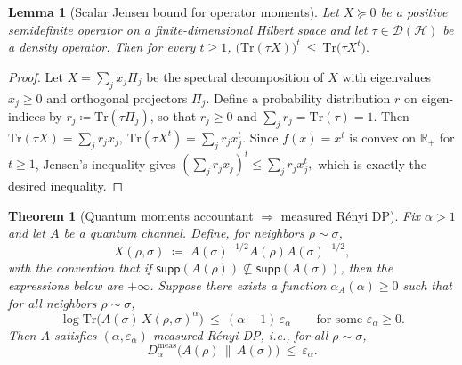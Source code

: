 \documentclass[11pt]{article}
\def\Tr{\mathrm{Tr}}
\def\supp{\mathsf{supp}}
\theoremstyle{plain}
\newtheorem{theorem}[theo]{Theorem}
\newtheorem{lemma}[theo]{Lemma}
\theoremstyle{remark}
\begin{document}
\begin{lemma}[Scalar Jensen bound for operator moments]
\label{lem:jensen-operator-moment}
Let $X\succeq 0$ be a positive semidefinite operator on a finite-dimensional Hilbert space and
let $\tau\in\mathcal{D}(\mathcal{H})$ be a density operator. Then for every $t\ge 1$,
$
\big(\Tr(\tau X)\big)^{t}\ \le\ \Tr\!\big(\tau X^{t}\big).
$
\end{lemma}

\begin{proof}
Let $X=\sum_j x_j \Pi_j$ be the spectral decomposition of $X$ with eigenvalues $x_j\ge 0$ and
orthogonal projectors $\Pi_j$. Define a probability distribution $r$ on eigen-indices by
$r_j \coloneqq \Tr(\tau \Pi_j)$, so that $r_j\ge 0$ and $\sum_j r_j = \Tr(\tau)=1$. Then
$
\Tr(\tau X)=\sum_j r_j x_j,
\
\Tr(\tau X^t)=\sum_j r_j x_j^{t}.
$
Since $f(x)=x^{t}$ is convex on $\mathbb{R}_+$ for $t\ge 1$, Jensen's inequality gives
$
\left(\sum_j r_j x_j\right)^t \le \sum_j r_j x_j^t,
$
which is exactly the desired inequality.
\end{proof}


\begin{theorem}[Quantum moments accountant $\Rightarrow$ measured R\'enyi DP]
\label{thm:qma-to-measured-rdp}
Fix $\alpha>1$ and let $A$ be a quantum channel. Define, for neighbors $\rho\sim\sigma$,
\[
X(\rho,\sigma)\;\coloneqq\;A(\sigma)^{-1/2}A(\rho)A(\sigma)^{-1/2},
\]
with the convention that if $\supp(A(\rho))\nsubseteq\supp(A(\sigma))$, then the expressions below
are $+\infty$. Suppose there exists a function $\alpha_A(\alpha)\ge 0$ such that for all neighbors
$\rho\sim\sigma$,
\begin{equation}
\label{eq:qma-bound-at-alpha}
\log \Tr\!\big(A(\sigma)\,X(\rho,\sigma)^{\alpha}\big)
\ \le\ (\alpha-1)\,\varepsilon_\alpha
\qquad\text{for some }\varepsilon_\alpha\ge 0.
\end{equation}
Then $A$ satisfies $(\alpha,\varepsilon_\alpha)$-\emph{measured R\'enyi DP}, i.e., for all
$\rho\sim\sigma$,
\[
D^{\mathrm{meas}}_\alpha\!\big(A(\rho)\,\|\,A(\sigma)\big)\ \le\ \varepsilon_\alpha.
\]
\end{theorem}
\end{document}
